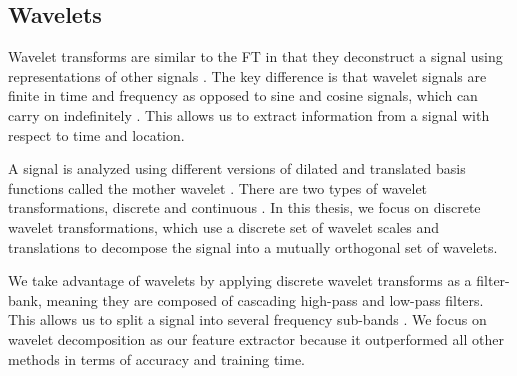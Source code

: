 \documentclass{turabian-thesis}
\begin{document}
\subsection{Wavelets}

Wavelet transforms are similar to the FT in that they deconstruct a signal using representations of other signals \cite{misiti_wavelets_2013}. The key difference is that wavelet signals are finite in time and frequency as opposed to sine and cosine signals, which can carry on indefinitely \cite{strang_wavelets_1996}. This allows us to extract information from a signal with respect to time and location.




A signal is analyzed using different versions of dilated and translated basis functions called the mother wavelet  \cite{strang_wavelets_1996}. There are two types of wavelet transformations, discrete and continuous \cite{imani_curve_2016}. In this thesis, we focus on discrete wavelet transformations, which use a discrete set of wavelet scales and translations to decompose the signal into a mutually orthogonal set of wavelets. 

We take advantage of wavelets by applying discrete wavelet transforms as a filter-bank, meaning they are composed of cascading high-pass and low-pass filters. This allows us to split a signal into several frequency sub-bands  \cite{strang_wavelets_1996}. We focus on wavelet decomposition as our feature extractor because it outperformed all other methods in terms of accuracy and training time.



\end{document}
